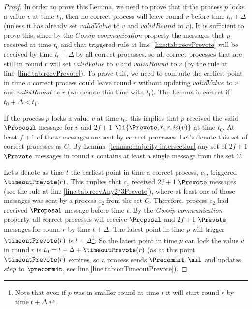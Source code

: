 \begin{proof} In order to prove this Lemma, we need to prove that if the
    process $p$ locks a value $v$ at time $t_0$, then no correct process will
    leave round $r$ before time $t_0 + \Delta$ (unless it has already set
    $validValue$ to $v$ and $validRound$ to $r$). It is sufficient to prove
    this, since by the \emph{Gossip communication} property the messages that
    $p$ received at time $t_0$ and that triggered rule at
    line~\ref{line:tab:recvPrevote} will be received by time $t_0 + \Delta$ by
    all correct processes, so all correct processes that are still in round $r$
    will set $validValue$ to $v$ and $validRound$ to $r$ (by the rule at
    line~\ref{line:tab:recvPrevote}). To prove this, we need to compute the
    earliest point in time a correct process could leave round $r$ without
    updating $validValue$ to $v$ and $validRound$ to $r$ (we denote this time
    with $t_1$). The Lemma is correct if $t_0 + \Delta < t_1$. 

If the process $p$ locks a value $v$ at time $t_0$, this implies that $p$
received the valid $\Proposal$ message for $v$ and $2f+1$
$\li{\Prevote,h,r,id(v)}$ at time $t_0$. At least $f+1$ of those messages are
sent by correct processes. Let's denote this set of correct processes as $C$. By
Lemma~\ref{lemma:majority-intersection} any set of $2f+1$ $\Prevote$ messages
in round $r$ contains at least a single message from the set $C$. 

Let's denote as time $t$ the earliest point in time a correct process, $c_1$, triggered
$\timeoutPrevote(r)$. This implies that $c_1$ received $2f+1$ $\Prevote$ messages
(see the rule at line \ref{line:tab:recvAny2/3Prevote}), where at least one of
those messages was sent by a process $c_2$ from the set $C$.  Therefore, process
$c_2$ had received $\Proposal$ message before time $t$. By the \emph{Gossip
communication} property, all correct processes will receive $\Proposal$ and
$2f+1$ $\Prevote$ messages for round $r$ by time $t+\Delta$. The latest point
in time $p$ will trigger $\timeoutPrevote(r)$ is $t+\Delta$\footnote{Note that
even if $p$ was in smaller round at time $t$ it will start round $r$ by time
$t+\Delta$.}.  So the latest point in time $p$ can lock the value $v$ in
round $r$ is $t_0 = t+\Delta+\timeoutPrevote(r)$ (as at this point
$\timeoutPrevote(r)$ expires, so a process sends $\Precommit$ $\nil$ and updates
$step$ to $\precommit$, see line \ref{line:tab:onTimeoutPrevote}).  


\end{proof}
